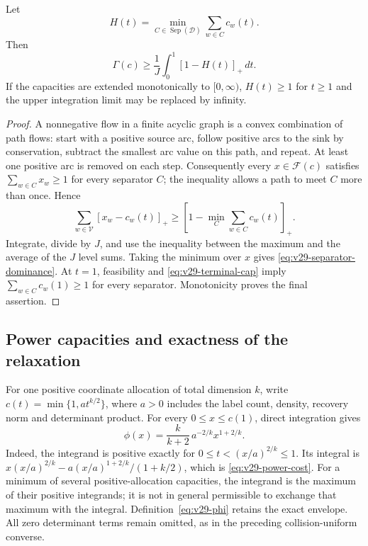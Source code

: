 \begin{proposition}
\label{prop:v29-separator-dominance}
Let
\[
 H(t)=\min_{C\in\operatorname{Sep}(\mathscr D)}
                                      \sum_{w\in C}c_w(t).
\]
Then
\begin{equation}\label{eq:v29-separator-dominance}
                 \Gamma(c)\ge\frac1J\int_0^1[1-H(t)]_+\,dt.
\end{equation}
If the capacities are extended monotonically to $[0,\infty)$,
$H(t)\ge1$ for $t\ge1$ and the upper integration limit may be
replaced by infinity.
\end{proposition}
\begin{proof}
A nonnegative flow in a finite acyclic graph is a convex combination
of path flows: start with a positive source arc, follow positive arcs
to the sink by conservation, subtract the smallest arc value on this
path, and repeat. At least one positive arc is removed on each step.
Consequently every $x\in\mathcal F(c)$ satisfies
$\sum_{w\in C}x_w\ge1$ for every separator $C$; the inequality
allows a path to meet $C$ more than once. Hence
\[
 \sum_{w\in\mathscr V}[x_w-c_w(t)]_+
 \ge\left[1-\min_C\sum_{w\in C}c_w(t)\right]_+.
\]
Integrate, divide by $J$, and use the inequality between the maximum
and the average of the $J$ level sums. Taking the minimum over $x$
gives \eqref{eq:v29-separator-dominance}. At $t=1$, feasibility and
\eqref{eq:v29-terminal-cap} imply $\sum_{w\in C}c_w(1)\ge1$ for
every separator. Monotonicity proves the final assertion.
\end{proof}

\subsection{Power capacities and exactness of the relaxation}
For one positive coordinate allocation of total dimension $k$, write
$c(t)=\min\{1,a t^{k/2}\}$, where $a>0$ includes the label count,
density, recovery norm and determinant product. For every
$0\le x\le c(1)$, direct integration gives
\begin{equation}\label{eq:v29-power-cost}
 \phi(x)=\frac{k}{k+2}\,a^{-2/k}x^{1+2/k}.
\end{equation}
Indeed, the integrand is positive exactly for
$0\le t<(x/a)^{2/k}\le1$. Its integral is
$x(x/a)^{2/k}-a(x/a)^{1+2/k}/(1+k/2)$, which is
\eqref{eq:v29-power-cost}. For a minimum of several positive-allocation
capacities, the integrand is the maximum of their positive integrands;
it is not in general permissible to exchange that maximum with the
integral. Definition~\eqref{eq:v29-phi} retains the exact envelope.
All zero determinant terms remain omitted, as in the preceding
collision-uniform converse.

